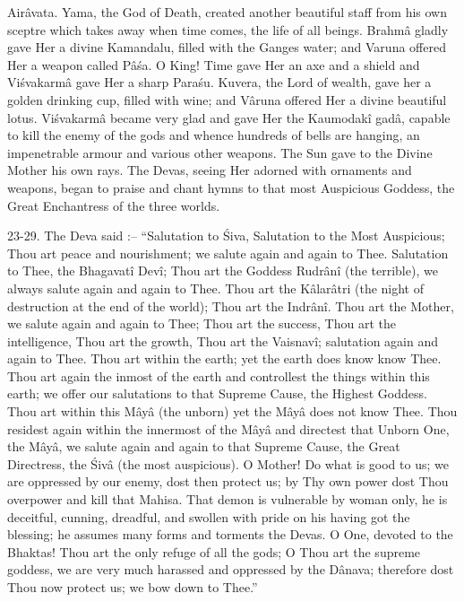Air\^avata. Yama, the God of Death, created another beautiful staff from his own sceptre which takes away when time comes, the life of all beings. Brahm\^a gladly gave Her a divine Kamandalu, filled with the Ganges water; and Varuna offered Her a weapon called P\^a\'sa. O King! Time gave Her an axe and a shield and Vi\'svakarm\^a gave Her a sharp Para\'su. Kuvera, the Lord of wealth, gave her a golden drinking cup, filled with wine; and V\^aruna offered Her a divine beautiful lotus. Vi\'svakarm\^a became very glad and gave Her the Kaumodak\^i gad\^a, capable to kill the enemy of the gods and whence hundreds of bells are hanging, an impenetrable armour and various other weapons. The Sun gave to the Divine Mother his own rays. The Devas, seeing Her adorned with ornaments and weapons, began to praise and chant hymns to that most Auspicious Goddess, the Great Enchantress of the three worlds.

23-29. The Deva said :-- ``Salutation to \'Siva, Salutation to the Most Auspicious; Thou art peace and nourishment; we salute again and again to Thee. Salutation to Thee, the Bhagavat\^i Dev\^i; Thou art the Goddess Rudr\^an\^i (the terrible), we always salute again and again to Thee. Thou art the K\^alar\^atri (the night of destruction at the end of the world); Thou art the Indr\^an\^i. Thou art the Mother, we salute again and again to Thee; Thou art the success, Thou art the intelligence, Thou art the growth, Thou art the Vaisnav\^i; salutation again and again to Thee. Thou art within the earth; yet the earth does know know Thee. Thou art again the inmost of the earth and controllest the things within this earth; we offer our salutations to that Supreme Cause, the Highest Goddess. Thou art within this M\^ay\^a (the unborn) yet the M\^ay\^a does not know Thee. Thou residest again within the innermost of the M\^ay\^a and directest that Unborn One, the M\^ay\^a, we salute again and again to that Supreme Cause, the Great Directress, the \'Siv\^a (the most auspicious). O Mother! Do what is good to us; we are oppressed by our enemy, dost then protect us; by Thy own power dost Thou overpower and kill that Mahisa. That demon is vulnerable by woman only, he is deceitful, cunning, dreadful, and swollen with pride on his having got the blessing; he assumes many forms and torments the Devas. O One, devoted to the Bhaktas! Thou art the only refuge of all the gods; O Thou art the supreme goddess, we are very much harassed and oppressed by the D\^anava; therefore dost Thou now protect us; we bow down to Thee.''

